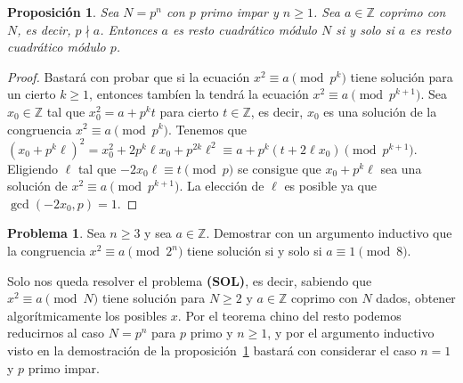 \documentclass[a4paper, 11pt]{article}
\newcommand{\ZZ}{\mathbb{Z}}
\newcounter{numerodetema}
\theoremstyle{plain}
\newtheorem{prop}[teor]{Proposición}
\theoremstyle{definition}
\newtheorem{prob}{Problema}[numerodetema]
\begin{document}
\begin{prop}\label{prop-88}
Sea $N=p^n$ con $p$ primo impar y $n\geq 1$. Sea $a\in\ZZ$ coprimo con $N$,
es decir, $p\nmid a$. Entonces $a$ es resto cuadrático módulo $N$ si y solo
si $a$ es resto cuadrático módulo $p$.
\end{prop}
\begin{proof}
Bastará con probar que si la ecuación $x^2\equiv a\pmod{p^k}$ tiene solución
para un cierto $k\geq 1$, entonces tambíen la tendrá la ecuación $x^2\equiv a
\pmod{p^{k+1}}$. Sea $x_0\in\ZZ$ tal que $x_0^2=a+p^kt$ para cierto $t\in\ZZ$,
es decir, $x_0$ es una solución de la congruencia $x^2\equiv a\pmod{p^k}$.
Tenemos que $(x_0+p^k\ell)^2=x_0^2+2p^k\ell x_0+p^{2k}\ell^2\equiv
a+p^k(t+2\ell x_0)\pmod{p^{k+1}}$. Eligiendo $\ell$ tal que
$-2 x_0\ell\equiv t\pmod{p}$ se consigue que $x_0+p^k\ell$ sea una solución
de $x^2\equiv a\pmod{p^{k+1}}$. La elección de $\ell$ es posible ya que
$\gcd(-2x_0,p)=1$.
\end{proof}

\begin{prob}
Sea $n\geq 3$ y sea $a\in\ZZ$. Demostrar con un argumento inductivo
que la congruencia $x^2\equiv a\pmod{2^n}$ tiene solución si y solo si
$a\equiv 1\pmod{8}$.
\end{prob}

\bigskip

Solo nos queda resolver el problema {\bf (SOL)}, es decir, sabiendo
que $x^2\equiv a\pmod{N}$ tiene solución para $N\geq 2$ y $a\in\ZZ$
coprimo con $N$ dados, obtener algorítmicamente los posibles $x$.
Por el teorema chino del resto podemos reducirnos al caso $N=p^n$
para $p$ primo y $n\geq 1$, y por el argumento inductivo visto en
la demostración de la proposición~\ref{prop-88} bastará con considerar
el caso $n=1$ y $p$ primo impar.

\bigskip
\end{document}
